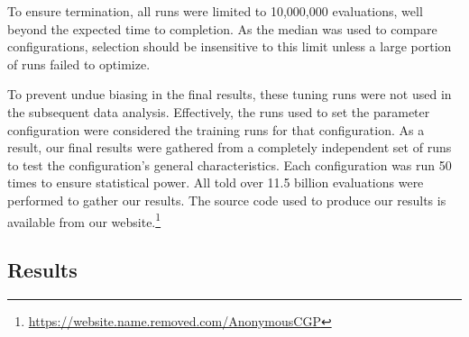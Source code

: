 \documentclass[journal]{IEEEtran}
\begin{document}
To ensure termination, all runs were limited to 10,000,000 evaluations, well beyond
the expected time to completion.  As the median was used to compare configurations,
selection should be insensitive to this limit unless a large
portion of runs failed to optimize.

To prevent undue biasing in the final results, these tuning runs were
not used in the subsequent data analysis.  Effectively, the runs used to set
the parameter configuration were considered
the training runs for that configuration.  As a result, our final results were gathered
from a completely independent set of runs to test the configuration's general characteristics.
Each configuration was run 50 times to ensure statistical power.  All told over
11.5 billion evaluations were performed to gather our results.  The source code
used to produce our results is available from our website.\footnote{\url{https://website.name.removed.com/AnonymousCGP}}


\subsection{Results}
\end{document}
